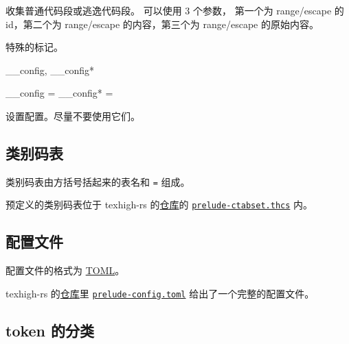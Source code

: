 \documentclass[class=article,openany]{cusdoc}[2025/10/10]
\begin{document}
\begin{function}{\THCollectRange}
  \begin{syntax}
    \V\THCollectRange {} \V\THrs {} \V\THre
    \V\THCollectRange {} \V\THes {} \V\THee
  \end{syntax}
收集普通代码段或逃逸代码段。 可以使用 3 个参数，
第一个为 range/escape 的 id，第二个为 range/escape 的内容，第三个为 range/escape 的原始内容。
\end{function}

\begin{function}{\THPASS}
特殊的标记。
\end{function}

\begin{keyval}[path=high]{__config, __config*}
  \begin{syntax}
    __config  =  
    __config* =  
  \end{syntax}
设置配置。尽量不要使用它们。
\end{keyval}

\subsection{类别码表}\label{sec:ctab}

类别码表由方括号括起来的表名和 \texttt{=} 组成。

预定义的类别码表位于 texhigh-rs 的\href{https://github.com/Sophanatprime/texhigh-rs}{仓库}的 \href{https://github.com/Sophanatprime/texhigh-rs/blob/main/src/prelude-ctabset.thcs}{\texttt{prelude-ctabset.thcs}} 内。

\subsection{配置文件}\label{sec:config}

配置文件的格式为 \href{https://toml.io/}{TOML}。

texhigh-rs 的\href{https://github.com/Sophanatprime/texhigh-rs}{仓库}里 \href{https://github.com/Sophanatprime/texhigh-rs/blob/main/src/prelude-config.toml}{\texttt{prelude-config.toml}} 给出了一个完整的配置文件。

\subsection{token 的分类}
\end{document}
